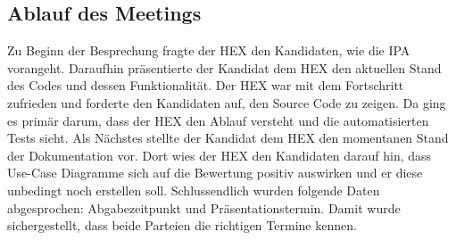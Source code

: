 \subsection{Ablauf des Meetings}
Zu Beginn der Besprechung fragte der HEX den Kandidaten, wie die IPA vorangeht. Daraufhin präsentierte der Kandidat dem HEX
den aktuellen Stand des Codes und dessen Funktionalität. Der HEX war mit dem Fortschritt zufrieden und forderte den
Kandidaten auf, den Source Code zu zeigen. Da ging es primär darum, dass der HEX den Ablauf versteht und die
automatisierten Tests sieht. \newline
Als Nächstes stellte der Kandidat dem HEX den momentanen Stand der Dokumentation vor. Dort wies der HEX den Kandidaten
darauf hin, dass Use-Case Diagramme sich auf die Bewertung positiv auswirken und er diese unbedingt noch erstellen soll.
\newline
Schlussendlich wurden folgende Daten abgesprochen: Abgabezeitpunkt und Präsentationstermin. Damit wurde sichergestellt, dass
beide Parteien die richtigen Termine kennen.
